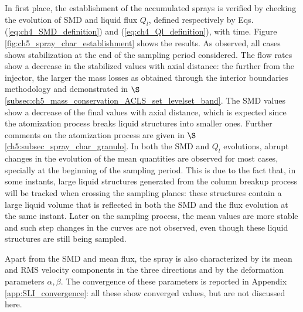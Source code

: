 In first place, the establishment of the accumulated sprays is verified by checking the evolution of SMD and liquid flux $Q_l$, defined respectively by Eqs. (\ref{eq:ch4_SMD_definition}) and (\ref{eq:ch4_Ql_definition}), with time. Figure \ref{fig:ch5_spray_char_establishment} shows the results. As observed, all cases shows stabilization at the end of the sampling period considered. The flow rates show a decrease in the stabilized values with axial distance: the further from the injector, the larger the mass losses as obtained through the interior boundaries methodology and demonstrated in $\S$\ref{subsec:ch5_mass_conservation_ACLS_set_levelset_band}. The SMD values show a decrease of the final values with axial distance, which is expected since the atomization process breaks liquid structures into smaller ones. Further comments on the atomization process are given in $\S$\ref{ch5:subsec_spray_char_granulo}. In both the SMD and $Q_l$ evolutions, abrupt changes in the evolution of the mean quantities are observed for most cases, specially at the beginning of the sampling period. This is due to the fact that, in some instants, large liquid structures generated from the column breakup process will be tracked when crossing the sampling planes: these structures contain a large liquid volume that is reflected in both the SMD and the flux evolution at the same instant. Later on the sampling process, the mean values are more stable and such step changes in the curves are not observed, even though these liquid structures are still being sampled.

Apart from the SMD and mean flux, the spray is also characterized by its mean and RMS velocity components in the three directions and by the deformation parameters $\alpha, \beta$. The convergence of these parameters is reported in Appendix \ref{app:SLI_convergence}: all these show converged values, but are not discussed here.



